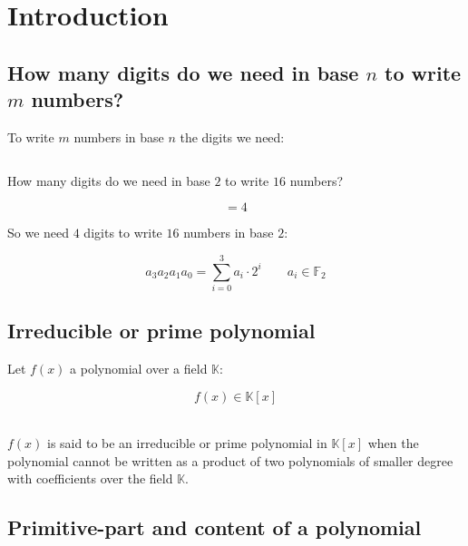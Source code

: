 %
%

\chapter{Introduction}

\section{How many digits do we need in base $n$ to write $m$ numbers?} \label{sec:many-digits-base-n}

To write $m$ numbers in base $n$ the digits we need:

\begin{displaymath}
[\log_n (m)]
\end{displaymath}

\begin{example} 
How many digits do we need in base $2$ to write $16$ numbers?

\begin{displaymath}
[\log_2 (16)] = 4
\end{displaymath}

So we need $4$ digits to write $16$ numbers in base $2$:

\begin{displaymath}
a_3a_2a_1a_0 = \sum_{i=0}^3 a_i \cdot 2^i \qquad a_i \in \mathbb{F}_2
\end{displaymath}

\end{example}

\section{Irreducible or prime polynomial}

Let $f(x)$ a polynomial over a field $\mathbb{K}$:

\begin{displaymath}
f(x) \in \mathbb{K}[x]
\end{displaymath}

\begin{definition} \label{def:prime-pol}
\ \\
$f(x)$ is said to be an irreducible or prime polynomial in $\mathbb{K}[x]$ when the polynomial cannot be written as a product of two polynomials of 
smaller degree with coefficients over the field $\mathbb{K}$.
\end{definition}

\section{Primitive-part and content of a polynomial}

